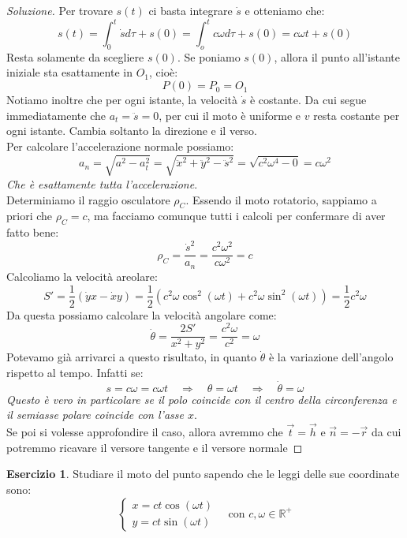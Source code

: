 \documentclass[11pt,a4paper,twoside]{article}
\theoremstyle{definition}
\newtheorem{ese}{Esercizio}[section]
\newenvironment{sol}
	{\renewcommand\qedsymbol{$\blacksquare$}\begin{proof}[Soluzione]}
	{\end{proof}}
\begin{document}
\begin{sol}
	Per trovare $s(t)$ ci basta integrare $\dot s$ e otteniamo che:
	\[ s(t) = \int_0^t \dot s d \tau + s(0)= \int_o^t c \omega d \tau + s(0) = c\omega t + s(0)\]
	Resta solamente da scegliere $s(0)$. Se poniamo $s(0)$, allora il punto all'istante iniziale sta esattamente in $O_1$, cioè:
	\[ P(0) = P_0 = O_1\]
	Notiamo inoltre che per ogni istante, la velocità $\dot s$ è costante. Da cui segue immediatamente che $a_t = \ddot s = 0$, per cui il moto è uniforme e $v$ resta costante per ogni istante. Cambia soltanto la direzione e il verso.\\
	Per calcolare l'accelerazione normale possiamo:
	\[ a_n = \sqrt{a^2-a_t^2} = \sqrt{\ddot x^2 + \ddot y^2 - \ddot s^2} = \sqrt{c^2\omega^4 - 0} = c\omega^2 \]
	\textit{Che è esattamente tutta l'accelerazione}.\\
	Determiniamo il raggio osculatore $\rho_C$. Essendo il moto rotatorio, sappiamo a priori che $\rho_C = c$, ma facciamo comunque tutti i calcoli per confermare di aver fatto bene:
	\[\rho_C = \frac{\dot s^2}{a_n} = \frac{c^2\omega^2}{c\omega^2} = c\]
	Calcoliamo la velocità areolare:
	\[S' = \frac 12 (\dot yx - \dot xy) = \frac 12 (c^2 \omega \cos^2(\omega t) + c^2 \omega \sin^2(\omega t)) = \frac 12 c^2 \omega\]
	Da questa possiamo calcolare la velocità angolare come:
	\[ \dot \theta = \frac{2S'}{x^2 + y^2} = \frac{c^2 \omega}{c^2} = \omega \]
	Potevamo già arrivarci a questo risultato, in quanto $\dot \theta$ è la variazione dell'angolo rispetto al tempo. Infatti se:
	\[ s = c \omega = c \omega t \quad 	\Rightarrow \quad \theta = \omega t \quad \Rightarrow \quad \dot \theta = \omega\]
	\textit{Questo è vero in particolare se il polo coincide con il centro della circonferenza e il semiasse polare coincide con l'asse $x$}.\\
	Se poi si volesse approfondire il caso, allora avremmo che $\vec t = \vec h$ e $\vec n = -\vec r$ da cui potremmo ricavare il versore tangente e il versore normale
\end{sol}

\begin{ese}
	Studiare il moto del punto sapendo che le leggi delle sue coordinate sono:
	\[ \begin{cases}
		x = ct \cos(\omega t)\\ y = ct \sin(\omega t)
	\end{cases} \quad \text{con }c, \omega \in \mathbb R^+\]
\end{ese}
\end{document}
